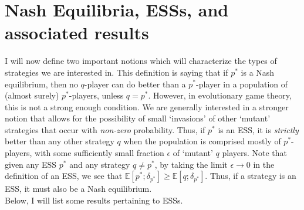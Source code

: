 \section{Nash Equilibria, ESSs, and associated results}\label{subsection_NE_and_ESS}
I will now define two important notions which will characterize the types of strategies we are interested in.
\label{def_NE}
This definition is saying that if $p^*$ is a Nash equilibrium, then no $q$-player can do better than a $p^*$-player in a population of (almost surely) $p^*$-players, unless $q=p^*$. However, in evolutionary game theory, this is not a strong enough condition. We are generally interested in a stronger notion that allows for the possibility of small `invasions' of other `mutant' strategies that occur with \textit{non-zero} probability.
Thus, if $p^*$ is an ESS, it is \textit{strictly} better than any other strategy $q$ when the population is comprised mostly of $p^*$-players, with some sufficiently small fraction $\epsilon$ of `mutant' $q$ players. Note that given any ESS $p^*$ and any strategy $q \neq p^*$, by taking the limit $\epsilon \to 0$ in the definition of an ESS, we see that $\mathbb{E}[p^*;\delta_{p^*}] \geq \mathbb{E}[q;\delta_{p^*}]$. Thus, if a strategy is an ESS, it must also be a Nash equilibrium.\\
Below, I will list some results pertaining to ESSs.
